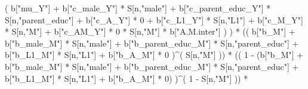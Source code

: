 \documentclass[
]{book}
\newenvironment{Shaded}{\begin{snugshade}}{\end{snugshade}}
\newcommand{\DecValTok}[1]{\textcolor[rgb]{0.00,0.00,0.81}{#1}}
\newcommand{\NormalTok}[1]{#1}
\newcommand{\SpecialCharTok}[1]{\textcolor[rgb]{0.00,0.00,0.00}{#1}}
\newcommand{\StringTok}[1]{\textcolor[rgb]{0.31,0.60,0.02}{#1}}
\begin{document}
\begin{Shaded}
\begin{Highlighting}[]
\NormalTok{                           ( b[}\StringTok{"mu\_Y"}\NormalTok{] }\SpecialCharTok{+} 
\NormalTok{                               b[}\StringTok{"c\_male\_Y"}\NormalTok{] }\SpecialCharTok{*}\NormalTok{ S[n,}\StringTok{"male"}\NormalTok{] }\SpecialCharTok{+} 
\NormalTok{                               b[}\StringTok{"c\_parent\_educ\_Y"}\NormalTok{] }\SpecialCharTok{*}\NormalTok{ S[n,}\StringTok{"parent\_educ"}\NormalTok{] }\SpecialCharTok{+} 
\NormalTok{                               b[}\StringTok{"c\_A\_Y"}\NormalTok{] }\SpecialCharTok{*} \DecValTok{0} \SpecialCharTok{+} 
\NormalTok{                               b[}\StringTok{"c\_L1\_Y"}\NormalTok{] }\SpecialCharTok{*}\NormalTok{ S[n,}\StringTok{"L1"}\NormalTok{] }\SpecialCharTok{+}
\NormalTok{                               b[}\StringTok{"c\_M\_Y"}\NormalTok{] }\SpecialCharTok{*}\NormalTok{ S[n,}\StringTok{"M"}\NormalTok{] }\SpecialCharTok{+} 
\NormalTok{                               b[}\StringTok{"c\_AM\_Y"}\NormalTok{] }\SpecialCharTok{*} \DecValTok{0} \SpecialCharTok{*}\NormalTok{ S[n,}\StringTok{"M"}\NormalTok{] }\SpecialCharTok{*}\NormalTok{ b[}\StringTok{"A.M.inter"}\NormalTok{] ) ) }\SpecialCharTok{*}
\NormalTok{      (( b[}\StringTok{"b\_M"}\NormalTok{] }\SpecialCharTok{+} 
\NormalTok{           b[}\StringTok{"b\_male\_M"}\NormalTok{] }\SpecialCharTok{*}\NormalTok{ S[n,}\StringTok{"male"}\NormalTok{] }\SpecialCharTok{+} 
\NormalTok{           b[}\StringTok{"b\_parent\_educ\_M"}\NormalTok{] }\SpecialCharTok{*}\NormalTok{ S[n,}\StringTok{"parent\_educ"}\NormalTok{] }\SpecialCharTok{+} 
\NormalTok{           b[}\StringTok{"b\_L1\_M"}\NormalTok{] }\SpecialCharTok{*}\NormalTok{ S[n,}\StringTok{"L1"}\NormalTok{] }\SpecialCharTok{+}
\NormalTok{           b[}\StringTok{"b\_A\_M"}\NormalTok{] }\SpecialCharTok{*} \DecValTok{0}\NormalTok{ )}\SpecialCharTok{\^{}}\NormalTok{( S[n,}\StringTok{"M"}\NormalTok{] )) }\SpecialCharTok{*} 
\NormalTok{      (( }\DecValTok{1} \SpecialCharTok{{-}}\NormalTok{ (b[}\StringTok{"b\_M"}\NormalTok{] }\SpecialCharTok{+} 
\NormalTok{                b[}\StringTok{"b\_male\_M"}\NormalTok{] }\SpecialCharTok{*}\NormalTok{ S[n,}\StringTok{"male"}\NormalTok{] }\SpecialCharTok{+} 
\NormalTok{                b[}\StringTok{"b\_parent\_educ\_M"}\NormalTok{] }\SpecialCharTok{*}\NormalTok{ S[n,}\StringTok{"parent\_educ"}\NormalTok{] }\SpecialCharTok{+} 
\NormalTok{                b[}\StringTok{"b\_L1\_M"}\NormalTok{] }\SpecialCharTok{*}\NormalTok{ S[n,}\StringTok{"L1"}\NormalTok{] }\SpecialCharTok{+}
\NormalTok{                b[}\StringTok{"b\_A\_M"}\NormalTok{] }\SpecialCharTok{*} \DecValTok{0}\NormalTok{) )}\SpecialCharTok{\^{}}\NormalTok{( }\DecValTok{1} \SpecialCharTok{{-}}\NormalTok{ S[n,}\StringTok{"M"}\NormalTok{] ))  }\SpecialCharTok{*}

\end{Highlighting}
\end{Shaded}
\end{document}
